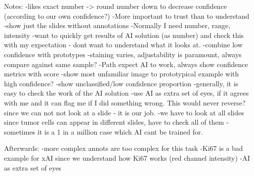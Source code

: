 Notes:
-likes exact number -> round number down to decrease confidence (according to our own confidence?)
-More important to trust than to understand
-show just the slides without annotations
-Normally I need number, range, intensity
-want to quickly get results of AI solution (as number) and check this with my expectation - dont want to understand what it looks at.
-combine low confidence with prototypes
-staining varies, adjustability is paramount, always compare against same sample?
-Path expect AI to work, always show confidence metrics with score
-show most unfamiliar image to prototypical example with high confidence?
-show unclassified/low confidence proportion
-generally, it is easy to check the work of the AI solution
-use AI as extra set of eyes, if it agrees with me and it can flag me if I did something wrong. This would never reverse? since we can not not look at a slide - it is our job.
-we have to look at all slides since tumor cells can appear in different slides, have to check all of them - sometimes it is a 1 in a million case which AI cant be trained for.

Afterwards:
-more complex annots are too complex for this task
-Ki67 is a bad example for xAI since we understand how Ki67 works (red channel intensity)
-AI as extra set of eyes